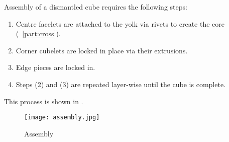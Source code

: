 Assembly of a dismantled cube requires the following steps:\begin{enumerate}
	\item Centre facelets are attached to the yolk via rivets to create the core (~\ref{part:cross}).
	\item Corner cubelets are locked in place via their extrusions.
	\item Edge pieces are locked in.
	\item Steps (2) and (3) are repeated layer-wise until the cube is complete.
\end{enumerate}
This process is shown in .
\begin{figure}[h]
	\centering
	\texttt{[image: assembly.jpg]}
	\caption{Assembly}\label{fig:assembly}
\end{figure}